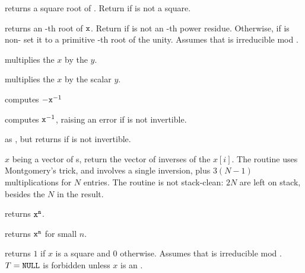  returns a square root of .
Return  if  is not a square.

 returns an
-th root of ${\tt x}$.  Return  if  is not an
-th power residue. Otherwise, if  is non- set it to
a primitive -th root of the unity. Assumes that  is irreducible
mod .





 multiplies the  $x$
by the  $y$.

 multiplies the  $x$
by the scalar $y$.



 computes $-{\tt x}^{-1}$

 computes ${\tt x}^{-1}$, raising an
error if  is not invertible.

 as , but returns
 if  is not invertible.


 $x$ being a vector of s,
return the vector of inverses of the $x[i]$. The routine uses Montgomery's
trick, and involves a single inversion, plus $3(N-1)$ multiplications for
$N$ entries. The routine is not stack-clean: $2N$  are left on
stack, besides the $N$ in the result.

 returns ${\tt x}^{\tt n}$.

 returns ${\tt x}^{\tt n}$
for small $n$.

 returns $1$ if $x$ is a square
and $0$ otherwise. Assumes that  is irreducible mod . $T =
{\tt NULL}$ is forbidden unless $x$ is an .

